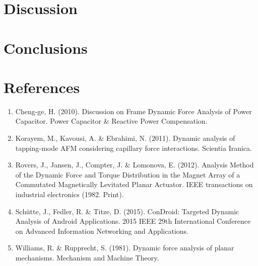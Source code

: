 \documentclass[12pt, titlepage]{article}
\begin{document}
\section{Discussion}
\newpage
\section{Conclusions}
\newpage
\section{References}
\begin{enumerate}
    \item \label{item:cheng2010} Cheng-ge, H. (2010). Discussion on Frame
      Dynamic Force Analysis of Power Capacitor. Power Capacitor \& Reactive
      Power Compensation.

    \item \label{item:korayem2011} Korayem, M., Kavousi, A. \& Ebrahimi, N.
    (2011). Dynamic analysis of tapping-mode AFM considering capillary force
    interactions. Scientia Iranica.

    \item \label{item:rovers2012} Rovers, J., Jansen, J., Compter, J. \&
    Lomonova, E. (2012). Analysis Method of the Dynamic Force and Torque
    Distribution in the Magnet Array of a Commutated Magnetically Levitated
    Planar Actuator. IEEE transactions on industrial electronics (1982. Print).

    \item \label{item:shutte2015} Schütte, J., Fedler, R. \& Titze, D. (2015).
    ConDroid: Targeted Dynamic Analysis of Android Applications. 2015 IEEE 29th
    International Conference on Advanced Information Networking and
    Applications.

    \item \label{item:williams1981} Williams, R. \& Rupprecht, S. (1981). Dynamic
    force analysis of planar mechanisms. Mechanism and Machine Theory.
\end{enumerate}
\end{document}

